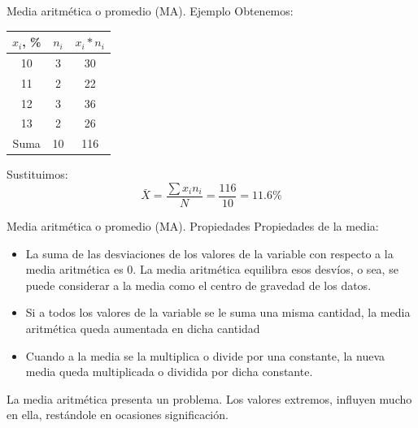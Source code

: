 \documentclass[11pt]{beamer}
\begin{document}
        \begin{frame}{Media aritmética o promedio (MA). Ejemplo}
          Obtenemos:
            \begin{table}[!h]
                \centering
                \begin{tabular}{|c|c|c|}
                    \hline
                    $x_i$, \% & $n_i$ & $x_i* n_i$\\
                    \hline
                    10  & 3 & 30\\
                    \hline
                    11  & 2 & 22\\
                    \hline
                    12  & 3 & 36\\
                    \hline
                    13  & 2 & 26\\
                    \hline
                    Suma & 10 & 116\\
                    \hline
                \end{tabular}
            \end{table}
          \pause
          Sustituimos:\\
          $$ \bar{X} =\dfrac{\sum x_in_i}{N}=\dfrac{116}{10}=11.6\%$$
        \end{frame}
        \begin{frame}{Media aritmética o promedio (MA). Propiedades}
          Propiedades de la media:
          \begin{itemize}
              \item La suma de las desviaciones de los valores de la variable con respecto a la media aritmética es 0. La media aritmética equilibra esos desvíos, o sea, se puede considerar a la media como el centro de gravedad de los datos.
              \item Si a todos los valores de la variable se le suma una misma cantidad, la media aritmética queda aumentada en dicha cantidad
              \item Cuando a la media se la multiplica o divide por una constante, la nueva media queda multiplicada o dividida por dicha constante.
          \end{itemize}
          \pause
          La media aritmética presenta un problema. Los valores extremos, influyen mucho en ella, restándole en ocasiones significación.
        \end{frame}
\end{document}
